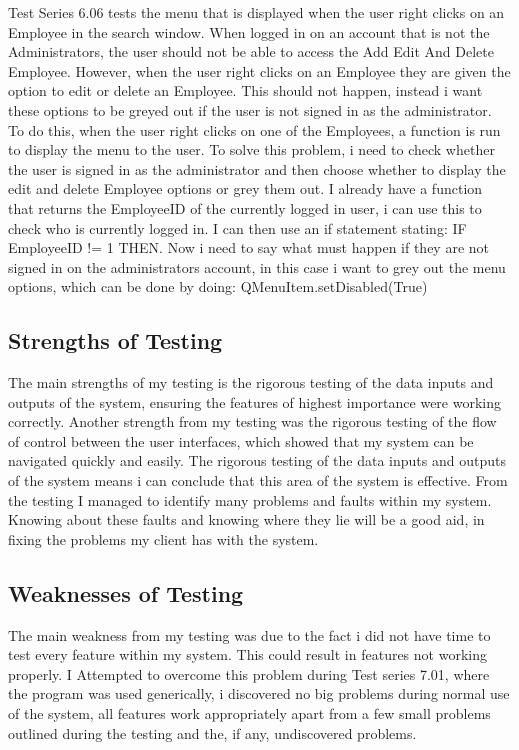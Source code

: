 Test Series 6.06 tests the menu that is displayed when the user right clicks on an Employee in the search window. When logged in on an account that is not the Administrators, the user should not be able to access the Add Edit And Delete Employee. However, when the user right clicks on an Employee they are given the option to edit or delete an Employee. This should not happen, instead i want these options to be greyed out if the user is not signed in as the administrator. To do this, when the user right clicks on one of the Employees, a function is run to display the menu to the user. To solve this problem, i need to check whether the user is signed in as the administrator and then choose whether to display the edit and delete Employee options or grey them out. I already have a function that returns the EmployeeID of the currently logged in user, i can use this to check who is currently logged in. I can then use an if statement stating: IF EmployeeID != 1 THEN. Now i need to say what must happen if they are not signed in on the administrators account, in this case i want to grey out the menu options, which can be done by doing: QMenuItem.setDisabled(True)




\subsection{Strengths of Testing}

The main strengths of my testing is the rigorous testing of the data inputs and outputs of the system, ensuring the features of highest importance were working correctly. Another strength from my testing was the rigorous testing of the flow of control between the user interfaces, which showed that my system can be navigated quickly and easily. The rigorous testing of the data inputs and outputs of the system means i can conclude that this area of the system is effective. From the testing I managed to identify many problems and faults within my system. Knowing about these faults and knowing where they lie will be a good aid, in fixing the problems my client has with the system.

\subsection{Weaknesses of Testing}

The main weakness from my testing was due to the fact i did not have time to test every feature within my system. This could result in features not working properly. I Attempted to overcome this problem during Test series 7.01, where the program was used generically, i discovered no big problems during normal use of the system, all features work appropriately apart from a few small problems outlined during the testing and the, if any, undiscovered problems.

